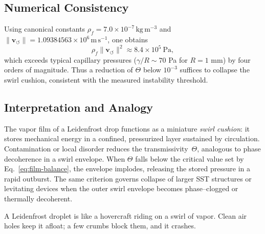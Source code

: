 \documentclass[10pt,reprint,aps,onecolumn,nofootinbib]{revtex4-2}
\begin{document}
    \subsection{Numerical Consistency}

    Using canonical constants
    $\rho_{\!f}=7.0\times10^{-7}\,\mathrm{kg\,m^{-3}}$
    and
    $\lVert\mathbf{v}_{\!\boldsymbol{\circlearrowleft}}\rVert
    =1.09384563\times10^{6}\,\mathrm{m\,s^{-1}}$,
    one obtains
    \[
    \rho_{\!f}\lVert\mathbf{v}_{\!\boldsymbol{\circlearrowleft}}\rVert^{2}
    \approx 8.4\times10^{5}\ \mathrm{Pa},
    \]
    which exceeds typical capillary pressures
    ($\gamma/R\!\sim\!70$ Pa for $R=1$ mm) by four orders of magnitude.
    Thus a reduction of $\Theta$ below $10^{-3}$ suffices to collapse the
    swirl cushion, consistent with the measured instability threshold.

    \subsection{Interpretation and Analogy}

    The vapor film of a Leidenfrost drop functions as a miniature
    \emph{swirl cushion}: it stores mechanical energy in a confined,
    pressurized layer sustained by circulation.
    Contamination or local disorder reduces the transmissivity~$\Theta$,
    analogous to phase decoherence in a swirl envelope.
    When $\Theta$ falls below the critical value set by
    Eq.~\eqref{eq:film-balance}, the envelope implodes,
    releasing the stored pressure in a rapid outburst.
    The same criterion governs collapse of larger SST structures or
    levitating devices when the outer swirl envelope becomes phase--clogged
    or thermally decoherent.

    \begin{tcolorbox}[colframe=gray, title={Physical Analogy}]
    A Leidenfrost droplet is like a hovercraft riding on a swirl of vapor.
    Clean air holes keep it afloat; a few crumbs block them, and it crashes.
    \end{tcolorbox}

\end{document}
